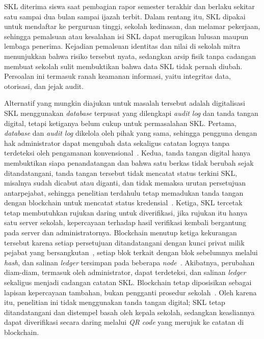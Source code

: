 SKL diterima siswa saat pembagian rapor semester terakhir dan berlaku sekitar satu sampai dua bulan sampai ijazah terbit. Dalam rentang itu, SKL dipakai untuk mendaftar ke perguruan tinggi, sekolah kedinasan, dan melamar pekerjaan, sehingga pemalsuan atau kesalahan isi SKL dapat merugikan lulusan maupun lembaga penerima. Kejadian pemalsuan identitas dan nilai di sekolah mitra menunjukkan bahwa risiko tersebut nyata, sedangkan arsip fisik tanpa cadangan membuat sekolah sulit membuktikan bahwa data SKL tidak pernah diubah. Persoalan ini termasuk ranah keamanan informasi, yaitu integritas data, otorisasi, dan jejak audit.

Alternatif yang mungkin diajukan untuk masalah tersebut adalah digitalisasi SKL menggunakan \textit{database} terpusat yang dilengkapi \textit{audit log} dan tanda tangan digital, tetapi ketiganya belum cukup untuk permasalahan SKL. Pertama, \textit{database} dan \textit{audit log} dikelola oleh pihak yang sama, sehingga pengguna dengan hak administrator dapat mengubah data sekaligus catatan lognya tanpa terdeteksi oleh pengamanan konvensional~\cite{Hafis2026Insider}. Kedua, tanda tangan digital hanya membuktikan siapa penandatangan dan bahwa satu berkas tidak berubah sejak ditandatangani, tanda tangan tersebut tidak mencatat status terkini SKL, misalnya sudah dicabut atau diganti, dan tidak memaksa urutan persetujuan antarpejabat, sehingga penelitian terdahulu tetap memadukan tanda tangan dengan blockchain untuk mencatat status kredensial~\cite{AlHemairy2024UAE}. Ketiga, SKL tercetak tetap membutuhkan rujukan daring untuk diverifikasi, jika rujukan itu hanya satu server sekolah, kepercayaan terhadap hasil verifikasi kembali bergantung pada server dan administratornya. Blockchain menutup ketiga kekurangan tersebut karena setiap persetujuan ditandatangani dengan kunci privat milik pejabat yang bersangkutan~\cite{FabricMSP}, setiap blok terkait dengan blok sebelumnya melalui \textit{hash}, dan salinan \textit{ledger} tersimpan pada beberapa \textit{node}~\cite{Rustemi2023SLR}. Akibatnya, perubahan diam-diam, termasuk oleh administrator, dapat terdeteksi, dan salinan \textit{ledger} sekaligus menjadi cadangan catatan SKL. Blockchain tetap diposisikan sebagai lapisan kepercayaan tambahan, bukan pengganti prosedur sekolah~\cite{Pandari2026Blockchain}. Oleh karena itu, penelitian ini tidak menggunakan tanda tangan digital; SKL tetap ditandatangani dan distempel basah oleh kepala sekolah, sedangkan keasliannya dapat diverifikasi secara daring melalui \textit{QR code} yang merujuk ke catatan di blockchain.


